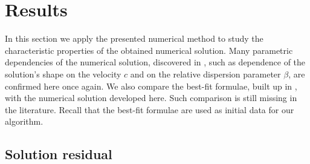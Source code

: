 \documentclass[preprint]{elsarticle}
\begin{document}
\section{Results}\label{results}

In this section we apply the presented  numerical method  to study the characteristic properties of the obtained numerical solution.  Many parametric dependencies of the numerical solution,  discovered in \cite{Ch2011,Ch2012}, such as dependence of the solution's shape on the velocity $c$ and on the relative dispersion parameter $\beta$, are confirmed here once again.
 We   also compare  the best-fit  formulae,  built up in \cite{Ch2011}, with the numerical solution  developed here. Such comparison is still missing in the literature.
Recall that the best-fit formulae   are used as initial data for our algorithm. 

\subsection{Solution residual}
\end{document}
